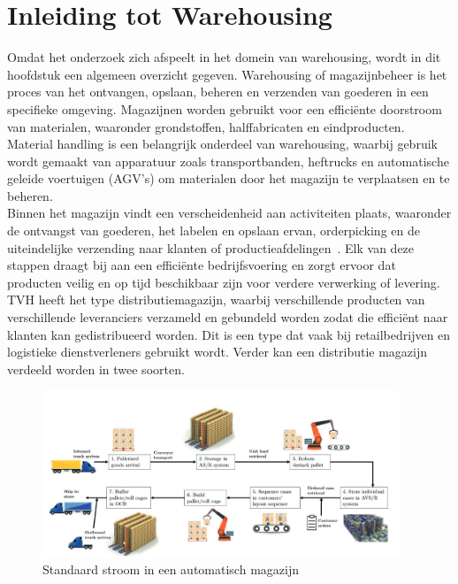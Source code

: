 \section{Inleiding tot Warehousing}
Omdat het onderzoek zich afspeelt in het domein van warehousing, wordt in dit hoofdstuk een algemeen overzicht gegeven.
Warehousing of magazijnbeheer is het proces van het ontvangen, opslaan, beheren en verzenden van goederen in een specifieke omgeving. 
Magazijnen worden gebruikt voor een efficiënte doorstroom van materialen, waaronder grondstoffen, halffabricaten en eindproducten.
Material handling is een belangrijk onderdeel van warehousing, waarbij gebruik wordt gemaakt van apparatuur zoals 
transportbanden, heftrucks en automatische geleide voertuigen (AGV’s) om materialen door het magazijn te verplaatsen en te beheren.
\\
Binnen het magazijn vindt een verscheidenheid aan activiteiten plaats, waaronder de ontvangst van goederen, 
het labelen en opslaan ervan, orderpicking en de uiteindelijke verzending naar klanten of productieafdelingen~\autocite{Berg1999}. 
Elk van deze stappen draagt bij aan een efficiënte bedrijfsvoering en zorgt ervoor dat producten veilig en op tijd beschikbaar 
zijn voor verdere verwerking of levering.
\\
TVH heeft het type distributiemagazijn, waarbij verschillende producten van verschillende leveranciers verzameld  
en gebundeld worden zodat die efficiënt naar klanten kan gedistribueerd worden. 
Dit is een type dat vaak bij retailbedrijven en logistieke dienstverleners gebruikt wordt.
Verder kan een distributie magazijn verdeeld worden in twee soorten.

\begin{figure}
  \centering
  \includegraphics[width=0.95\textwidth]{../bachproef/img/warehousing_flow.png}
  \caption[Flow in a typical fully automated warehouse]{\label{fig:warehousing-flow}Standaard stroom in een automatisch magazijn~\autocite{Koster2018}}
\end{figure}

